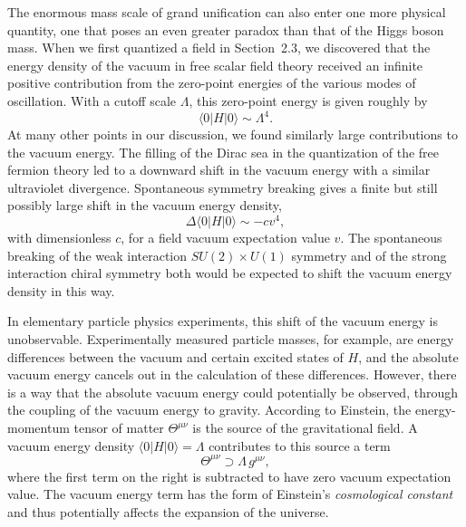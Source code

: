 The enormous mass scale of grand unification can also enter one more physical
quantity, one that poses an even greater paradox than that of the Higgs
boson mass.  When we first quantized a field in Section~2.3, we discovered
that the energy density of the vacuum in free scalar field theory received an
infinite positive contribution from the zero-point energies of the various
modes of oscillation.  With a cutoff scale $\Lambda$, this zero-point energy
is given roughly by
\begin{equation}
  \langle 0|H|0\rangle \sim \Lambda^4 .
  \label{eq:22.10}
\end{equation}
At many other points in our discussion, we found similarly large
contributions to the vacuum energy.  The filling of the Dirac sea in the
quantization of the free fermion theory led to a downward shift in the vacuum
energy with a similar ultraviolet divergence.  Spontaneous symmetry breaking
gives a finite but still possibly large shift in the vacuum energy density,
\begin{equation}
  \Delta\langle 0|H|0\rangle \sim -cv^4 ,
  \label{eq:22.11}
\end{equation}
with dimensionless $c$, for a field vacuum expectation value $v$.  The
spontaneous breaking of the weak interaction $SU(2)\times U(1)$ symmetry and
of the strong interaction chiral symmetry both would be expected to shift the
vacuum energy density in this way.

In elementary particle physics experiments, this shift of the vacuum energy
is unobservable.  Experimentally measured particle masses, for example, are
energy differences between the vacuum and certain excited states of $H$, and
the absolute vacuum energy cancels out in the calculation of these
differences.  However, there is a way that the absolute vacuum energy could
potentially be observed, through the coupling of the vacuum energy to
gravity.  According to Einstein, the energy-momentum tensor of matter
$\Theta^{\mu\nu}$ is the source of the gravitational field.  A vacuum energy
density $\langle 0|H|0\rangle = \Lambda$ contributes to this source a term
\begin{equation}
  \Theta^{\mu\nu} \supset \Lambda\,g^{\mu\nu} ,
  \label{eq:22.12}
\end{equation}
where the first term on the right is subtracted to have zero vacuum
expectation value.  The vacuum energy term has the form of Einstein's
\emph{cosmological constant} and thus potentially affects the expansion of
the universe.

